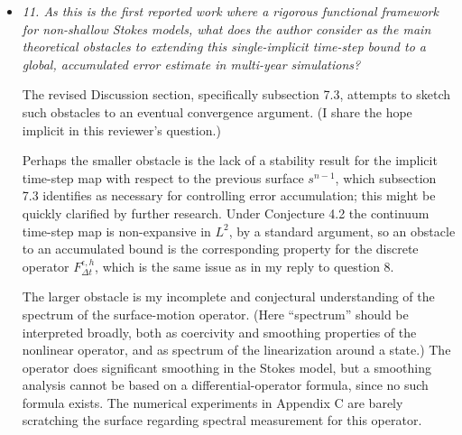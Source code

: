 \documentclass[11pt,reqno]{amsart}
\newcommand{\eps}{\epsilon}
\newcommand{\reply}[2]{%
\medskip
\item \emph{#1}

\medskip
\noindent #2
}
\begin{document}
\begin{itemize}[itemindent=0mm, labelsep=5mm]
\reply{11. As this is the first reported work where a rigorous functional framework for non-shallow Stokes models, what does the author consider as the main theoretical obstacles to extending this single-implicit time-step bound to a global, accumulated error estimate in multi-year simulations?}
{The revised Discussion section, specifically subsection 7.3, attempts to sketch such obstacles to an eventual convergence argument.  (I share the hope implicit in this reviewer's question.) \par
Perhaps the smaller obstacle is the lack of a stability result for the implicit time-step map with respect to the previous surface $s^{n-1}$, which subsection 7.3 identifies as necessary for controlling error accumulation; this might be quickly clarified by further research.  Under Conjecture 4.2 the continuum time-step map is non-expansive in $L^2$, by a standard argument, so an obstacle to an accumulated bound is the corresponding property for the discrete operator $F^{\eps,h}_{\Delta t}$, which is the same issue as in my reply to question 8. \par
The larger obstacle is my incomplete and conjectural understanding of the spectrum of the surface-motion operator.  (Here ``spectrum'' should be interpreted broadly, both as coercivity and smoothing properties of the nonlinear operator, and as spectrum of the linearization around a state.)  The operator does significant smoothing in the Stokes model, but a smoothing analysis cannot be based on a differential-operator formula, since no such formula exists.  The numerical experiments in Appendix C are barely scratching the surface regarding spectral measurement for this operator.}
\end{itemize}
\end{document}
